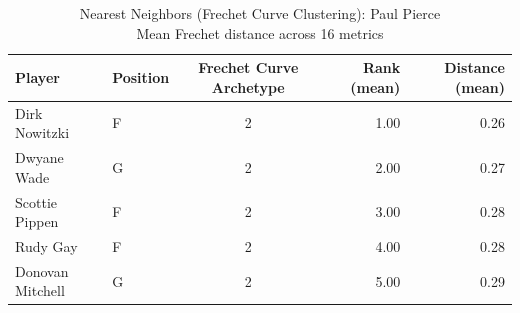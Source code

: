 \begin{table}[t]
\caption*{
{\fontsize{20}{25} Nearest Neighbors (Frechet Curve Clustering): Paul Pierce\fontsize{12}{15}\selectfont } \\ 
{\fontsize{14}{17}\selectfont  Mean Frechet distance across 16 metrics\fontsize{12}{15}\selectfont }
} 
\fontsize{12.0pt}{14.0pt}\selectfont
\begin{tabular*}{\linewidth}{@{\extracolsep{\fill}}llcrr}
\toprule
Player & Position & Frechet Curve Archetype & Rank (mean) & Distance (mean) \\ 
\midrule\addlinespace[2.5pt]
Dirk Nowitzki & F & 2 & 1.00 & 0.26 \\ 
Dwyane Wade & G & 2 & 2.00 & 0.27 \\ 
Scottie Pippen & F & 2 & 3.00 & 0.28 \\ 
Rudy Gay & F & 2 & 4.00 & 0.28 \\ 
Donovan Mitchell & G & 2 & 5.00 & 0.29 \\ 
\bottomrule
\end{tabular*}
\end{table}

